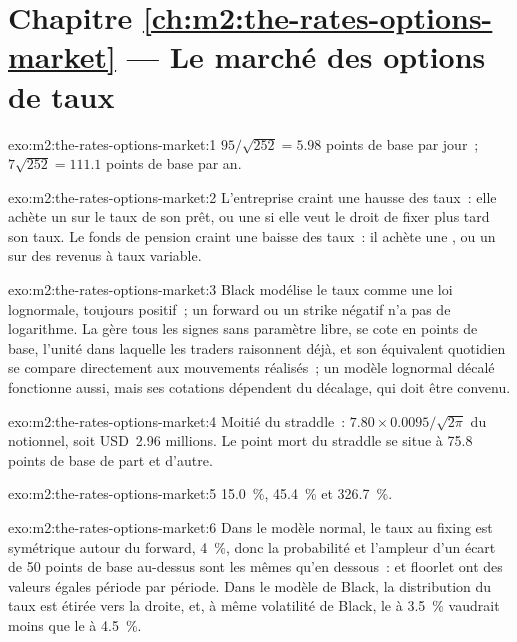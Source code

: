 \section*{Chapitre \ref{ch:m2:the-rates-options-market} --- Le marché des options de taux}

\begin{solution}{exo:m2:the-rates-options-market:1}
$95/\sqrt{252} = 5.98$ points de base par jour~; $7\sqrt{252} = 111.1$ points de base par
an.
\end{solution}

\begin{solution}{exo:m2:the-rates-options-market:2}
L'entreprise craint une hausse des taux~: elle achète un  sur le taux de son prêt, ou une
 si elle veut le droit de fixer plus tard son taux. Le fonds de pension craint
une baisse des taux~: il achète une , ou un  sur des revenus à taux variable.
\end{solution}

\begin{solution}{exo:m2:the-rates-options-market:3}
Black modélise le taux comme une loi lognormale, toujours positif~; un forward ou
un strike négatif n'a pas de logarithme. La  gère tous les signes sans
paramètre libre, se cote en points de base, l'unité dans laquelle les traders raisonnent déjà, et son
équivalent quotidien se compare directement aux mouvements réalisés~; un modèle lognormal décalé
fonctionne aussi, mais ses cotations dépendent du décalage, qui doit être convenu.
\end{solution}

\begin{solution}{exo:m2:the-rates-options-market:4}
Moitié du straddle~: $7.80 \times 0.0095/\sqrt{2\pi}$ du notionnel, soit USD~2.96
millions. Le point mort du straddle se situe à 75.8 points de base de part et d'autre.
\end{solution}

\begin{solution}{exo:m2:the-rates-options-market:5}
15.0~\%, 45.4~\% et 326.7~\%.
\end{solution}

\begin{solution}{exo:m2:the-rates-options-market:6}
Dans le modèle normal, le taux au fixing est symétrique autour du forward, 4~\%,
donc la probabilité et l'ampleur d'un écart de 50 points de base au-dessus sont les mêmes qu'en dessous~:
 et floorlet ont des valeurs égales période par période. Dans le modèle de Black, la
distribution du taux est étirée vers la droite, et, à même
volatilité de Black, le  à 3.5~\% vaudrait moins que le  à 4.5~\%.
\end{solution}

